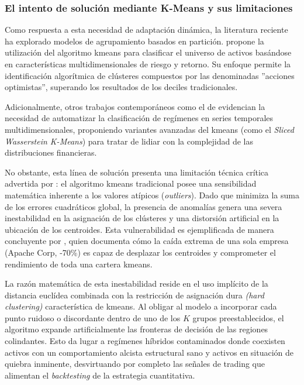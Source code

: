 \documentclass[
]{article}
\begin{document}
	\subsubsection{El intento de solución mediante K-Means y sus
		limitaciones}\label{el-intento-de-soluciuxf3n-mediante-k-means-y-sus-limitaciones}
	
	Como respuesta a esta necesidad de adaptación dinámica, la literatura
	reciente ha explorado modelos de agrupamiento basados en partición.
	\textcite{aslam2025identifying} propone la utilización del algoritmo \gls{kmeans} para
	clasificar el universo de activos basándose en características
	multidimensionales de riesgo y retorno. Su enfoque permite la
	identificación algorítmica de clústeres compuestos por las denominadas
	''acciones optimistas'', superando los resultados de los deciles
	tradicionales.
	
	Adicionalmente, otros trabajos contemporáneos como el de \textcite{luan2025automated} evidencian la necesidad de automatizar la clasificación de
	regímenes en series temporales multidimensionales, proponiendo variantes
	avanzadas del \gls{kmeans} (como el \emph{Sliced Wasserstein K-Means}) para
	tratar de lidiar con la complejidad de las distribuciones financieras.
	
	No obstante, esta línea de solución presenta una limitación técnica
	crítica advertida por \textcite{nyffeler2024classification}: el algoritmo \gls{kmeans} tradicional
	posee una sensibilidad matemática inherente a los valores atípicos
	(\emph{outliers}). Dado que minimiza la suma de los errores cuadráticos
	global, la presencia de anomalías genera una severa inestabilidad en la
	asignación de los clústeres y una distorsión artificial en la ubicación
	de los centroides. Esta vulnerabilidad es ejemplificada de manera
	concluyente por \textcite{bin2020k}, quien documenta cómo la caída extrema de
	una sola empresa (Apache Corp, -70\%) es capaz de desplazar los
	centroides y comprometer el rendimiento de toda una cartera \gls{kmeans}.
	
	La razón matemática de esta inestabilidad reside en el uso implícito de la distancia euclídea combinada con la restricción de asignación dura \emph{(hard clustering)} característica de \gls{kmeans}. Al obligar al modelo a incorporar cada punto ruidoso o discordante dentro de uno de los $K$ grupos preestablecidos, el algoritmo expande artificialmente las fronteras de decisión de las regiones colindantes. Esto da lugar a regímenes híbridos contaminados donde coexisten activos con un comportamiento alcista estructural sano y activos en situación de quiebra inminente, desvirtuando por completo las señales de \gls{trading} que alimentan el \emph{backtesting} de la estrategia cuantitativa.
	
\end{document}
